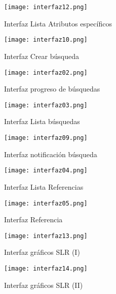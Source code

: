 \begin{figure}[!hpt]
	\begin{center} 
		\texttt{[image: interfaz12.png]}
		\caption{Interfaz Lista Atributos específicos}
		\label{fig:interfaz05}
	\end{center}
\end{figure}

\begin{figure}[!hpt]
	\begin{center} 
		\texttt{[image: interfaz10.png]}
		\caption{Interfaz Crear búsqueda}
		\label{fig:interfaz06}
	\end{center}
\end{figure}

\begin{figure}[!hpt]
	\begin{center} 
		\texttt{[image: interfaz02.png]}
		\caption{Interfaz progreso de búsquedas}
		\label{fig:interfaz07}
	\end{center}
\end{figure}

\begin{figure}[!hpt]
	\begin{center} 
		\texttt{[image: interfaz03.png]}
		\caption{Interfaz Lista búsquedas}
		\label{fig:interfaz08}
	\end{center}
\end{figure}

\begin{figure}[!hpt]
	\begin{center} 
		\texttt{[image: interfaz09.png]}
		\caption{Interfaz notificación búsqueda}
		\label{fig:interfaz09}
	\end{center}
\end{figure}

\begin{figure}[!hpt]
	\begin{center} 
		\texttt{[image: interfaz04.png]}
		\caption{Interfaz Lista Referencias}
		\label{fig:interfaz10}
	\end{center}
\end{figure}

\begin{figure}[!hpt]
	\begin{center} 
		\texttt{[image: interfaz05.png]}
		\caption{Interfaz Referencia}
		\label{fig:interfaz11}
	\end{center}
\end{figure}

\begin{figure}[!hpt]
	\begin{center} 
		\texttt{[image: interfaz13.png]}
		\caption{Interfaz gráficos SLR (I)}
		\label{fig:interfaz12}
	\end{center}
\end{figure}

\begin{figure}[!hpt]
	\begin{center} 
		\texttt{[image: interfaz14.png]}
		\caption{Interfaz gráficos SLR (II)}
		\label{fig:interfaz13}
	\end{center}
\end{figure}
